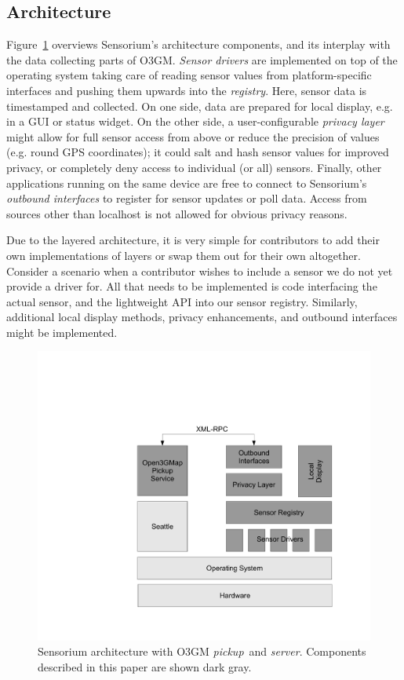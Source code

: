 \subsection{Architecture}

Figure~\ref{c5:fig:architecture} overviews Sensorium's architecture components, and its interplay with the data collecting parts of O3GM. \textit{Sensor drivers} are implemented on top of the operating system taking care of reading sensor values from platform-specific interfaces and pushing them upwards into the \textit{registry}. Here, sensor data is timestamped and collected. On one side, data are prepared for local display, e.g. in a GUI or status widget. On the other side, a user-configurable \textit{privacy layer} might allow for full sensor access from above or reduce the precision of values (e.g. round GPS coordinates); it could salt and hash sensor values for improved privacy, or completely deny access to individual (or all) sensors. Finally, other applications running on the same device are free to connect to Sensorium's \textit{outbound interfaces} to register for sensor updates or poll data. Access from sources other than localhost is not allowed for obvious privacy reasons.

Due to the layered architecture, it is very simple for contributors to add their own implementations of layers or swap them out for their own altogether. Consider a scenario when a contributor wishes to include a sensor we do not yet provide a driver for. All that needs to be implemented is code interfacing the actual sensor, and the lightweight API into our sensor registry. Similarly, additional local display methods, privacy enhancements, and outbound interfaces might be implemented.

\begin{figure}[t!]
\centering
\includegraphics[width=0.85\columnwidth]{images/architecture.pdf}
\caption{\small Sensorium architecture with O3GM \textit{pickup}~and \textit{server}. Components described in this paper are shown dark gray.}
\label{c5:fig:architecture}
\end{figure}

